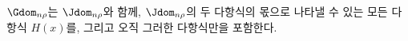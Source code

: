 
$\Gdom_{n\rho}$는 $\Jdom_{n\rho}$와 함께, $\Jdom_{n\rho}$의 두 다항식의 몫으로 나타낼 수 있는 모든 다항식 $H(x)$를, 그리고 오직 그러한 다항식만을 포함한다.
